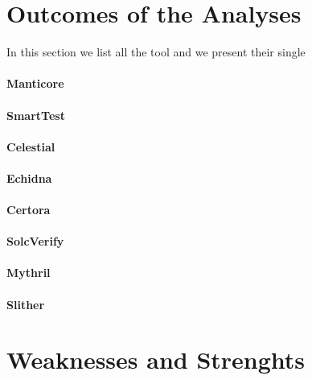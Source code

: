 \section{Outcomes of the Analyses}
In this section we list all the tool and we present their single 


\paragraph{Manticore} 
\paragraph{SmartTest}
\paragraph{Celestial}
\paragraph{Echidna}
\paragraph{Certora}
\paragraph{SolcVerify}
\paragraph{Mythril}
\paragraph{Slither}

\section{Weaknesses and Strenghts}

